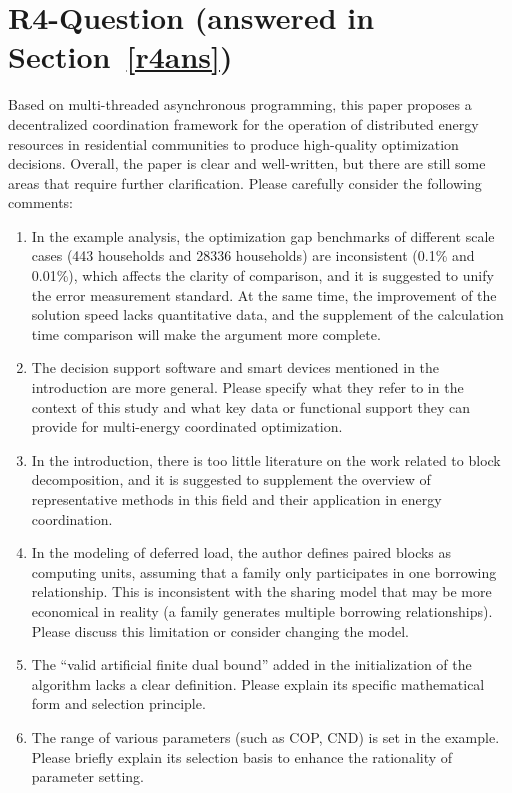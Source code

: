 \documentclass[11pt]{article}
\newcommand{\sect}[1]{\textbf{Section}~\ref{#1}}
\begin{document}
\section{R4-Question (answered in \sect{r4ans})}
Based on multi-threaded asynchronous programming, this paper proposes a decentralized coordination framework for the operation of distributed energy resources in residential communities to produce high-quality optimization decisions. Overall, the paper is clear and well-written, but there are still some areas that require further clarification. Please carefully consider the following comments:
\begin{enumerate}
    \item In the example analysis, the optimization gap benchmarks of different scale cases (443 households and 28336 households) are inconsistent (0.1\% and 0.01\%), which affects the clarity of comparison, and it is suggested to unify the error measurement standard. At the same time, the improvement of the solution speed lacks quantitative data, and the supplement of the calculation time comparison will make the argument more complete.
    \item The decision support software and smart devices mentioned in the introduction are more general. Please specify what they refer to in the context of this study and what key data or functional support they can provide for multi-energy coordinated optimization.
    \item In the introduction, there is too little literature on the work related to block decomposition, and it is suggested to supplement the overview of representative methods in this field and their application in energy coordination.
    \item In the modeling of deferred load, the author defines paired blocks as computing units, assuming that a family only participates in one borrowing relationship. This is inconsistent with the sharing model that may be more economical in reality (a family generates multiple borrowing relationships). Please discuss this limitation or consider changing the model.
    \item The “valid artificial finite dual bound” added in the initialization of the algorithm lacks a clear definition. Please explain its specific mathematical form and selection principle.
    \item The range of various parameters (such as COP, CND) is set in the example. Please briefly explain its selection basis to enhance the rationality of parameter setting.
\end{enumerate}
\end{document}
